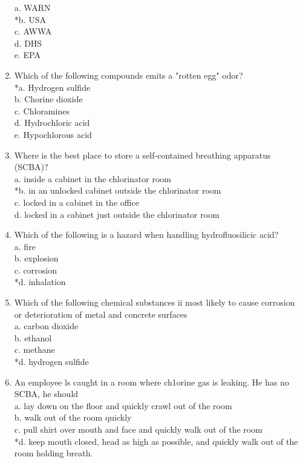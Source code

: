 \begin{enumerate}[1.]
a. WARN\\
*b. USA\\
c. AWWA\\
d. DHS\\
e. EPA\\
\item Which of the following compounds emits a "rotten egg" odor?\\
*a. Hydrogen sulfide\\
b. Chorine dioxide\\
c. Chloramines\\
d. Hydrochloric acid\\
e. Hypochlorous acid\\
\item Where is the best place to store a self-contained breathing apparatus (SCBA)?\\
a. inside a cabinet in the chlorinator room\\
*b. in an unlocked cabinet outside the chlorinator room\\
c. locked in a cabinet in the office\\
d. locked in a cabinet just outside the chlorinator room\\
\item Which of the following is a hazard when handling hydrofluosilicic acid?\\
a. fire\\
b. explosion\\
c. corrosion\\
*d. inhalation\\
\item Which of the following chemical substances ii most likely to cause corrosion or deterioration of metal and concrete surfaces\\
a. carbon dioxide\\
b. ethanol\\
c. methane\\
*d. hydrogen sulfide\\
\item An employee ls caught in a room where ch1orine gas is leaking. He has no SCBA, he should\\
a. lay down on the floor and quickly crawl out of the room\\
b. walk out of the room quickly\\
c. pull shirt over mouth and face and quickly walk out of the room\\
*d. keep mouth closed, head as high as possible, and quickly walk out of the room holding breath.\\

\end{enumerate}
